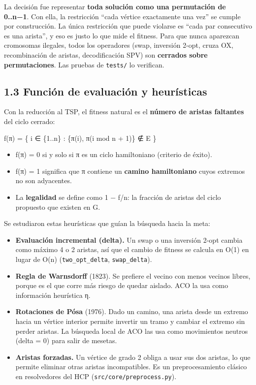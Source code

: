 \documentclass[
  spanish,
  12pt,
]{article}
\providecommand{\tightlist}{%
  \setlength{\itemsep}{0pt}\setlength{\parskip}{0pt}}
\begin{document}
La decisión fue representar \textbf{toda solución como una permutación
de 0..n−1}. Con ella, la restricción ``cada vértice exactamente una
vez'' se cumple por construcción. La única restricción que puede
violarse es ``cada par consecutivo es una arista'', y eso es justo lo
que mide el fitness. Para que nunca aparezcan cromosomas ilegales, todos
los operadores (swap, inversión 2-opt, cruza OX, recombinación de
aristas, decodificación SPV) son \textbf{cerrados sobre permutaciones}.
Las pruebas de \texttt{tests/} lo verifican.

\subsection{1.3 Función de evaluación y
heurísticas}\label{funciuxf3n-de-evaluaciuxf3n-y-heuruxedsticas}

Con la reducción al TSP, el fitness natural es el \textbf{número de
aristas faltantes} del ciclo cerrado:

f(π) = \textbar\{ i ∈ \{1..n\} : \{π(i), π(i mod n + 1)\} ∉ E
\}\textbar{}

\begin{itemize}
\tightlist
\item
  f(π) = 0 si y solo si π es un ciclo hamiltoniano (criterio de éxito).
\item
  f(π) = 1 significa que π contiene un \textbf{camino hamiltoniano}
  cuyos extremos no son adyacentes.
\item
  La \textbf{legalidad} se define como 1 − f/n: la fracción de aristas
  del ciclo propuesto que existen en G.
\end{itemize}

Se estudiaron estas heurísticas que guían la búsqueda hacia la meta:

\begin{itemize}
\tightlist
\item
  \textbf{Evaluación incremental (delta).} Un swap o una inversión 2-opt
  cambia como máximo 4 o 2 aristas, así que el cambio de fitness se
  calcula en O(1) en lugar de O(n) (\texttt{two\_opt\_delta},
  \texttt{swap\_delta}).
\item
  \textbf{Regla de Warnsdorff} (1823). Se prefiere el vecino con menos
  vecinos libres, porque es el que corre más riesgo de quedar aislado.
  ACO la usa como información heurística η.
\item
  \textbf{Rotaciones de Pósa} (1976). Dado un camino, una arista desde
  un extremo hacia un vértice interior permite invertir un tramo y
  cambiar el extremo sin perder aristas. La búsqueda local de ACO las
  usa como movimientos neutros (delta = 0) para salir de mesetas.
\item
  \textbf{Aristas forzadas.} Un vértice de grado 2 obliga a usar sus dos
  aristas, lo que permite eliminar otras aristas incompatibles. Es un
  preprocesamiento clásico en resolvedores del HCP
  (\texttt{src/core/preprocess.py}).
\end{itemize}
\end{document}
